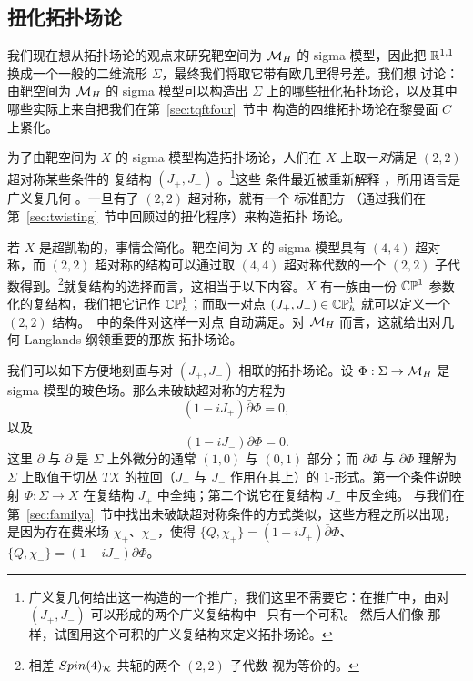 
\subsection{扭化拓扑场论}

\label{sec:twistedtft}

我们现在想从拓扑场论的观点来研究靶空间为 $\MH$ 的 sigma 模型，因此把
$\Bbb{R}^{1,1}$ 换成一个一般的二维流形 $\Sigma$，最终我们将取它带有欧几里得号差。我们想
讨论：由靶空间为 $\MH$ 的 sigma 模型可以构造出 $\Sigma$ 上的哪些扭化拓扑场论，以及其中哪些实际上来自把我们在第~\ref{sec:tqftfour}~节中
构造的四维拓扑场论在黎曼面 $C$ 上紧化。

 \cite{ref66}
 \cite{ref67}
\cite{ref68}


为了由靶空间为 $X$ 的 sigma 模型构造拓扑场论，人们在 $X$ 上取一\emph{对}满足 $(2,2)$ 超对称某些条件的
复结构 $(J_+,J_-)$ 。\footnote{广义复几何给出这一构造的一个推广，我们这里不需要它：在推广中，由对 $(J_+,J_-)$ 可以形成的两个广义复结构中 \cite{ref67}\ 只有一个可积。
然后人们像  那样，试图用这个可积的广义复结构来定义拓扑场论。}这些
条件最近被重新解释 ，所用语言是广义复几何 \cite{ref69}。一旦有了 $(2,2)$ 超对称，就有一个
标准配方 \cite{ref70}（通过我们在第~\ref{sec:twisting}~节中回顾过的扭化程序）来构造拓扑
场论。

若 $X$ 是超凯勒的，事情会简化。靶空间为 $X$ 的
sigma 模型具有 $(4,4)$ 超对称，而 $(2,2)$ 超对称的结构可以通过取
$(4,4)$ 超对称代数的一个 $(2,2)$ 子代数得到。\footnote{相差 $Spin(4)_{\cal R}$ 共轭的两个 $(2,2)$ 子代数
视为等价的。}就复结构的选择而言，这相当于以下内容。$X$ 有一族由一份
$\Bbb{CP}^1$ 参数化的复结构，我们把它记作
$\Bbb{CP}^1_h$；而取一对点 $(J_+,J_-)\in \Bbb{CP}_h^1$ 就可以定义一个 $(2,2)$ 结构。\cite{ref66}\ 中的条件对这样一对点
自动满足。对 $\MH$ 而言，这就给出对几何 Langlands 纲领重要的那族
拓扑场论。

我们可以如下方便地刻画与对 $(J_+,J_-)$ 相联的拓扑场论。设 $\Phi: \Sigma\to
\MH$ 是 sigma 模型的玻色场。那么未破缺超对称的方程为
\setcounter{equation}{4}
\begin{equation}\label{eq:hson}
(1-iJ_+)\bar\partial\Phi=0,
\end{equation}
 以及
\setcounter{equation}{5}
\begin{equation}\label{eq:hsono}
(1-iJ_-)\partial \Phi=0.
\end{equation}
  这里 $\partial$ 与
$\bar\partial$ 是 $\Sigma$ 上外微分的通常 $(1,0)$ 与 $(0,1)$ 部分；而 $\partial\Phi$ 与
$\bar\partial \Phi$ 理解为 $\Sigma$ 上取值于切丛 $TX$ 的拉回（$J_+$
与 $J_-$ 作用在其上）的 1-形式。第一个条件说映射
$\Phi:\Sigma\to X$ 在复结构 $J_+$ 中全纯；第二个说它在复结构 $J_-$ 中反全纯。
与我们在第~\ref{sec:familya}~节中找出未破缺超对称条件的方式类似，这些方程之所以出现，是因为存在费米场 $\chi_+$、$\chi_-$，使得
$\{Q,\chi_+\}=(1-iJ_+)\bar\partial\Phi$、
$\{Q,\chi_-\}=(1-iJ_-)\partial\Phi$。

